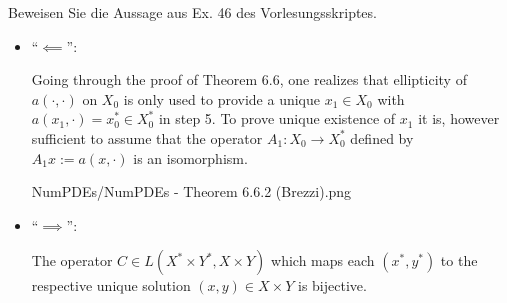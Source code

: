 
\begin{exercise}

Beweisen Sie die Aussage aus Ex. 46 des Vorlesungsskriptes.


\end{exercise}


\begin{solution}

\phantom{}

\begin{itemize}
  
  \item \enquote{$\impliedby$}:
  
  Going through the proof of Theorem 6.6, one realizes that ellipticity of $a(\cdot, \cdot)$ on $X_0$ is only used to provide a unique $x_1 \in X_0$ with $a(x_1, \cdot) = x_0^\ast \in X_0^\ast$ in step 5.
  To prove unique existence of $x_1$ it is, however sufficient to assume that the operator $A_1: X_0 \to X_0^\ast$ defined by $A_1 x := a(x, \cdot)$ is an isomorphism.

  {NumPDEs/NumPDEs - Theorem 6.6.2 (Brezzi).png}

  \begin{comment}

    In the proof of Theorem 6.6 the ellipticity of $a(\cdot, \cdot)$ on $X_0$ is only used to provide a unique $x_1 \in X_0$ with $a(x_1, \cdot) = x^\ast - a(x_2, \cdot) \in X_0^\ast$ in Step 5.
    Replacing the assumption for $a$ in Theorem 6.6 with our assumptions, we first obtain that $A_1: X_0 \to X_0^\ast$ is an isomorphism.
    With that we can conclude again, that there is an unique $x_1 \in X_0$ with $a(x_1, \cdot) = x^\ast - a(x_2, \cdot) \in X_0^\ast$.

  \end{comment}

  \item \enquote{$\implies$}:

  The operator $C \in L(X^\ast \times Y^\ast, X \times Y)$ which maps each $(x^\ast, y^\ast)$ to the respective unique solution $(x, y) \in X \times Y$ is bijective.


\end{itemize}
\end{solution}
